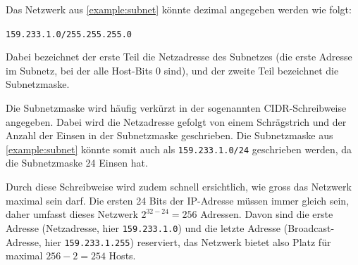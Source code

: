 \begin{mydefinition}
Das Netzwerk aus \cref{example:subnet} könnte dezimal angegeben werden wie folgt:

\texttt{159.233.1.0/255.255.255.0}

Dabei bezeichnet der erste Teil die Netzadresse des Subnetzes (die erste Adresse im Subnetz, bei der alle Host-Bits 0 sind), und der zweite Teil bezeichnet die Subnetzmaske.

Die Subnetzmaske wird häufig verkürzt in der sogenannten \gls{CIDR}-Schreibweise angegeben. Dabei wird die Netzadresse gefolgt von einem Schrägstrich und der Anzahl der Einsen in der Subnetzmaske geschrieben. Die Subnetzmaske aus \cref{example:subnet} könnte somit auch als \texttt{159.233.1.0/24} geschrieben werden, da die Subnetzmaske 24 Einsen hat.

Durch diese Schreibweise wird zudem schnell ersichtlich, wie gross das Netzwerk maximal sein darf. Die ersten 24 Bits der \gls{IP}-Adresse müssen immer gleich sein, daher umfasst dieses Netzwerk $2^{32-24} = 256$ Adressen. Davon sind die erste Adresse (Netzadresse, hier \texttt{159.233.1.0}) und die letzte Adresse (Broadcast-Adresse, hier \texttt{159.233.1.255}) reserviert, das Netzwerk bietet also Platz für maximal $256 - 2 = 254$ Hosts.
\end{mydefinition}


